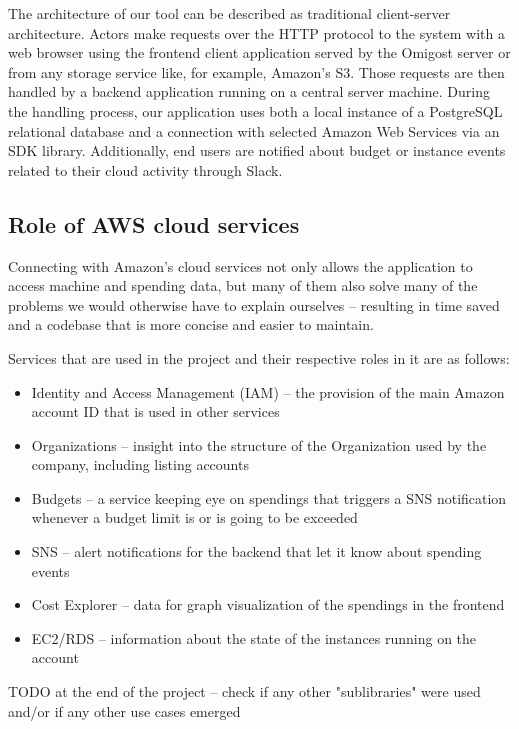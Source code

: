 \documentclass[licencjacka,en]{thesisclass}
\begin{document}
    The architecture of our tool can be described as traditional client-server architecture.
    Actors make requests over the HTTP protocol to the system with a web browser
    using the frontend client application
    served by the Omigost server or from any storage
    service like, for example, Amazon's S3.
    Those requests are then handled by a backend application running on a central server machine.
    During the handling process, our application uses both a local instance
    of a PostgreSQL relational database
    and a connection with selected Amazon Web Services via an SDK library.
    Additionally, end users are notified about budget or instance events
    related to their cloud activity through Slack.

    \subsection{Role of AWS cloud services}
    Connecting with Amazon's cloud services not only allows the application
    to access machine and spending data,
    but many of them also solve many of the problems we would otherwise have
    to explain ourselves -- resulting
    in time saved and a codebase that is more concise and easier to maintain.

    Services that are used in the project and their respective roles in it are as follows:
    \begin{itemize}
        \item Identity and Access Management (IAM) -- the provision of the main
          Amazon account ID that is used in other services
        \item Organizations -- insight into the structure of the Organization
          used by the company, including listing accounts
        \item Budgets -- a service keeping eye on spendings that triggers
          a SNS notification whenever a budget limit is or is going to be exceeded
        \item SNS -- alert notifications for the backend that let it know about spending events
        \item Cost Explorer -- data for graph visualization of the spendings in the frontend
        \item EC2/RDS -- information about the state of the instances running on the account
    \end{itemize}

    TODO at the end of the project -- check if any other
    "sublibraries" were used and/or if any other use cases emerged
\end{document}
